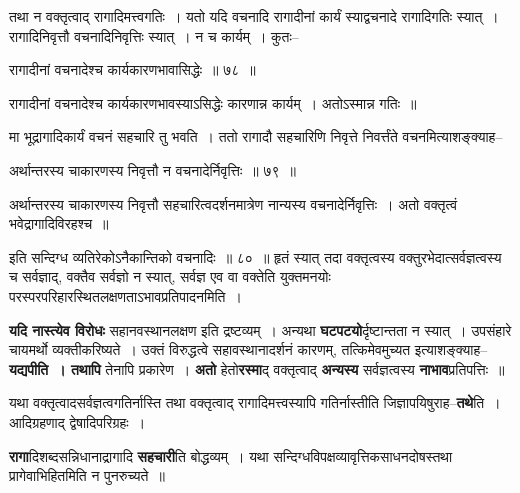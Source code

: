 \documentclass[article,12pt,a4paper]{memoir}
\begin{document}
	तथा न वक्तृत्वाद् रागादिमत्त्वगतिः । यतो यदि वचनादि रागादीनां कार्यं स्याद्वचनादे रागादिगतिः स्यात् । रागादिनिवृत्तौ वचनादिनिवृत्तिः स्यात् । न च कार्यम् । कुतः--  
	  
	रागादीनां वचनादेश्च कार्यकारणभावासिद्धेः ॥ ७८ ॥ 
	  
	रागादीनां वचनादेश्च कार्यकारणभावस्याऽसिद्धेः कारणान्न कार्यम् । अतोऽस्मान्न गतिः ॥  
	  
	मा भूद्रागादिकार्यं वचनं सहचारि तु भवति । ततो रागादौ सहचारिणि निवृत्ते निवर्त्तंते वचनमित्याशङ्क्याह--  
	  
	अर्थान्तरस्य चाकारणस्य निवृत्तौ न वचनादेर्निवृत्तिः ॥ ७९ ॥ 
	  
	अर्थान्तरस्य चाकारणस्य निवृत्तौ सहचारित्वदर्शनमात्रेण नान्यस्य वचनादेर्निवृत्तिः । अतो वक्तृत्वं भवेद्रागादिविरहश्च ॥  
	  
	इति सन्दिग्ध व्यतिरेकोऽनैकान्तिको वचनादिः ॥ ८० ॥ हृतं स्यात् तदा वक्तृत्वस्य वक्तुरभेदात्सर्वज्ञत्वस्य च सर्वज्ञाद्, वक्तैव सर्वज्ञो न स्यात्, सर्वज्ञ एव वा वक्तेति युक्तमनयोः परस्परपरिहारस्थितलक्षणताऽभावप्रतिपादनमिति ।
	\pend
      

	  \pstart \textbf{यदि नास्त्येव विरोधः} सहानवस्थानलक्षण इति द्रष्टव्यम् । अन्यथा \textbf{घटपटयो}र्दृष्टान्तता न स्यात् । उपसंहारे चायमर्थो व्यक्तीकरिष्यते । उक्तं विरुद्धत्वे सहावस्थानादर्शनं कारणम्, तत्किमेवमुच्यत इत्याशङ्क्याह--\textbf{यद्यपीति । तथापि} तेनापि प्रकारेण । \textbf{अतो} हेतो\textbf{रस्मा}द् वक्तृत्वाद् \textbf{अन्यस्य} सर्वज्ञत्वस्य \textbf{नाभाव}प्रतिपत्तिः ॥
	\pend
      

	  \pstart यथा वक्तृत्वादसर्वज्ञत्वगतिर्नास्ति तथा वक्तृत्वाद् रागादिमत्त्वस्यापि गतिर्नास्तीति जिज्ञापयिषुराह--\textbf{तथे}ति । आदिग्रहणाद् द्वेषादिपरिग्रहः ।
	\pend
      

	  \pstart \textbf{रागा}दिशब्दसन्निधानाद्रागादि \textbf{सहचारी}ति बोद्धव्यम् । यथा सन्दिग्धविपक्षव्यावृत्तिकसाधनदोषस्तथा प्रागेवाभिहितमिति न पुनरुच्यते ॥
	\pend
	  \bigskip
	  \begingroup
	
\end{document}
